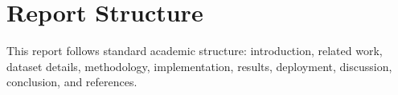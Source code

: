 \section{Report Structure}
This report follows standard academic structure: introduction, related work, dataset details, methodology, implementation, results, deployment, discussion, conclusion, and references.
